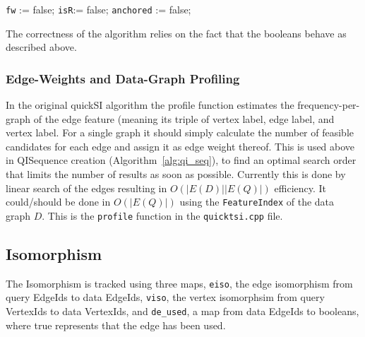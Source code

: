 \begin{algorithm}
  \label{alg:add}
  \caption{$\seq.\texttt{add}(e, Q)$}

  \texttt{fw} := false;
  \texttt{isR}:= false;
  \texttt{anchored} := false;
  
\end{algorithm}

The correctness of the algorithm relies on the fact that the booleans behave as
described above.



\subsubsection{Edge-Weights and Data-Graph Profiling}
In the original quickSI algorithm the profile function estimates the
frequency-per-graph of the edge feature (meaning its triple of vertex label,
edge label, and vertex label.  For a single graph it should simply calculate the
number of feasible candidates for each edge and assign it as edge weight
thereof.  This is used above in QISequence creation
(Algorithm~\ref{alg:qi_seq}), to find an optimal search order that limits the
number of results as soon as possible. Currently this is done by linear search
of the edges resulting in $O(|E(D)||E(Q)|)$ efficiency.  It could/should be done
in $O(|E(Q)|)$ using the \texttt{FeatureIndex} of the data graph $D$. This is
the \texttt{profile} function in the \texttt{quicktsi.cpp} file.


\subsection{Isomorphism}
The Isomorphism is tracked using three maps, \texttt{eiso}, the edge isomorphism
from query EdgeIds to data EdgeIds, \texttt{viso}, the vertex isomorphsim from
query VertexIds to data VertexIds, and \texttt{de\_used}, a map from data
EdgeIds to booleans, where true represents that the edge has been used.

